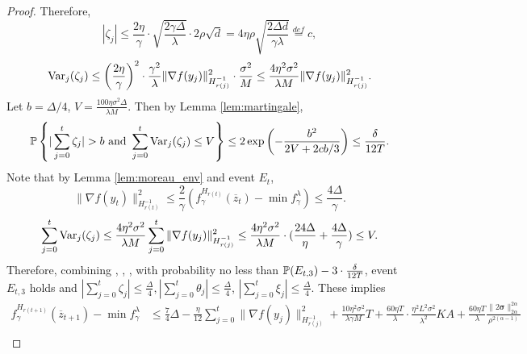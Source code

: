 \documentclass{article} %
\numberwithin{equation}{section}
\newcommand{\cirone}{\text{\ding{172}}}
\newcommand{\cirtwo}{\text{\ding{173}}}
\newcommand{\cirthree}{\text{\ding{174}}}
\begin{document}
\begin{proof}
    Therefore,
    \begin{equation}
        |\zeta_j|\leq \frac{2\eta}{\gamma} \cdot\sqrt{\frac{2\gamma\Delta}{\lambda}}\cdot 2\rho\sqrt{d} = 4\eta\rho\sqrt{\frac{2\Delta d}{\gamma\lambda}}\overset{def}{=}c,
    \end{equation}
    \begin{equation}
        \mathrm{Var}_j(\zeta_j) 
        \leq \left(\frac{2\eta}{\gamma}\right)^2\cdot \frac{\gamma^2}{\lambda}\|\nabla f(y_j)\|_{H_{r(j)}^{-1}}^2 \cdot \frac{\sigma^2}{M} \leq \frac{4\eta^2\sigma^2}{\lambda M}\|\nabla f(y_j)\|_{H_{r(j)}^{-1}}^2.
    \end{equation}
    Let $b=\Delta/4$, $V=\frac{100\eta\sigma^2\Delta}{\lambda M}$. Then by Lemma \ref{lem:martingale}, 
    \begin{equation}
        \prob \left\{|\sum_{j=0}^{t}\zeta_j|>b \text{ and } \sum_{j=0}^{t}\Var_j(\zeta_j)\leq V\right\} \leq 2\exp{\left( -\frac{b^2}{2V+2cb/3}\right)}\leq \frac{\delta}{12T}.
    \end{equation}
    Note that  by Lemma \ref{lem:moreau_env} and event $E_t$, 
    \begin{equation}
        \|\nabla f(y_t)\|_{H_{r(t)}^{-1}}^2\leq \frac{2}{\gamma}(f_\gamma^{H_{r(t)}}(\overline{z}_t)-\min f_\gamma^\lambda)\leq \frac{4\Delta}{\gamma}.
    \end{equation}
    \begin{equation}
        \sum_{j=0}^{t}\mathrm{Var}_j(\zeta_j)
        \leq \frac{4\eta^2\sigma^2}{\lambda M}\sum_{j=0}^t\|\nabla f(y_j)\|_{H_{r(j)}^{-1}}^2
        \leq \frac{4\eta^2\sigma^2}{\lambda M}\cdot (\frac{24\Delta}{\eta}+\frac{4\Delta}{\gamma})\leq V.
    \end{equation}
    Therefore, combining \cirone, \cirtwo, \cirthree, with probability no less than $\mathbb{P}(E_{t,3})-3\cdot\frac{\delta}{12T}$, event $E_{t,3}$ holds and $|\sum_{j=0}^t \zeta_j|\leq \frac{\Delta}{4}, |\sum_{j=0}^t \theta_j|\leq \frac{\Delta}{4}$, $|\sum_{j=0}^t \xi_j|\leq \frac{\Delta}{4}$. These implies
    \begin{equation}
        \begin{aligned}
            f_\gamma^{H_{r(t+1)}}(\overline{z}_{t+1})-\min f_\gamma^\lambda
            &\leq \frac{7}{4}\Delta - \frac{\eta}{12} \sum_{j=0}^t\|\nabla f(y_j)\|_{H_{r(j)}^{-1}}^2 
            +\frac{10\eta^2\sigma^2}{\lambda\gamma M}T + \frac{60\eta T}{\lambda}\cdot \frac{\eta^2L^2\sigma^2}{\lambda^2}KA + \frac{60\eta T}{\lambda} \frac{\|2\boldsymbol{\sigma}\|_{2\alpha}^{2\alpha}}{\rho^{2(\alpha-1)}} \\

\end{aligned}
\end{equation}
\end{proof}
\end{document}
